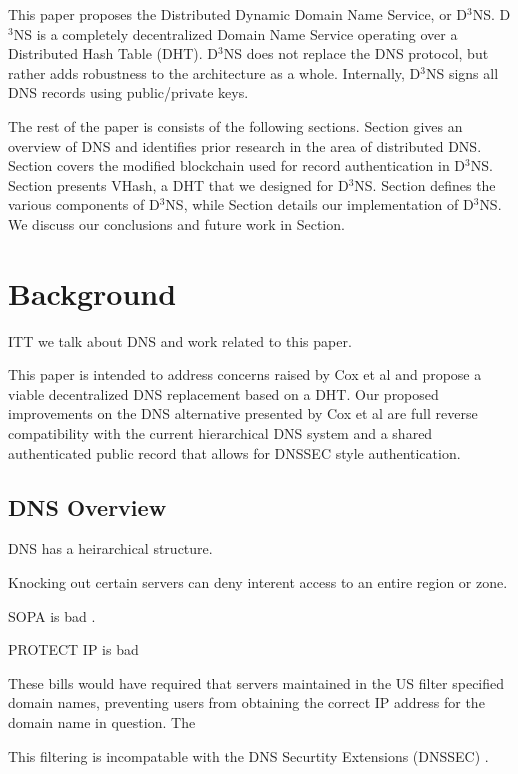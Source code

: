 \documentclass[11pt]{IEEEtran} %
\begin{document}
This paper proposes the Distributed Dynamic Domain Name Service, or D$^{3}$NS.  D$^{3}$NS is a completely decentralized Domain Name Service operating over a Distributed Hash Table (DHT).  D$^{3}$NS does not replace the DNS protocol, but rather adds robustness to the architecture as a whole.  Internally, D$^3$NS signs all DNS records using public/private keys.


The rest of the paper is consists of the following sections.  Section gives an overview of DNS and identifies prior research in the area of distributed DNS.  Section covers the modified blockchain used for record authentication in D$^3$NS.  Section presents VHash, a DHT that we designed for D$^3$NS.  Section defines the various components of D$^3$NS, while Section details our implementation of D$^3$NS.  We discuss our conclusions and future work in Section.



\section{Background}



ITT we talk about DNS and work related to this paper.


This paper is intended to address concerns raised by Cox et al\cite{cox} and propose a viable decentralized DNS replacement based on a DHT. Our proposed improvements on the DNS alternative presented by Cox et al are full reverse compatibility with the current hierarchical DNS system and a shared authenticated public record that allows for DNSSEC style authentication.


\subsection{DNS Overview}

DNS has a heirarchical structure.

Knocking out certain servers can deny interent access to an entire region or zone.

SOPA \cite{sopa} is bad \cite{lemley2011don}. 

PROTECT IP is bad \cite{crocker2011security}

These bills would have required that servers maintained in the US filter specified domain names, preventing users from obtaining the correct IP address for the domain name in question. The 

This filtering is incompatable with the DNS Securtity Extensions (DNSSEC) \cite{crocker2011security}. 
\end{document}
